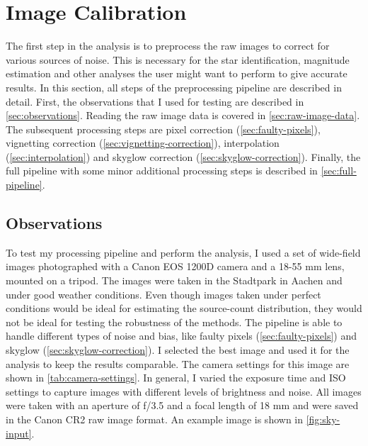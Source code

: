 
\section{Image Calibration}
\label{sec:image-calibration}

The first step in the analysis is to preprocess the raw images to correct for various
sources of noise. This is necessary for the star identification, magnitude estimation and
other analyses the user might want to perform to give accurate results. In this section,
all steps of the preprocessing pipeline are described in detail. First, the observations
that I used for testing are described in \autoref{sec:observations}. Reading the raw image
data is covered in \autoref{sec:raw-image-data}. The subsequent processing steps are pixel
correction (\autoref{sec:faulty-pixels}), vignetting correction
(\autoref{sec:vignetting-correction}), interpolation (\autoref{sec:interpolation}) and
skyglow correction (\autoref{sec:skyglow-correction}). Finally, the full pipeline with
some minor additional processing steps is described in \autoref{sec:full-pipeline}.

\subsection{Observations}
\label{sec:observations}

To test my processing pipeline and perform the analysis, I used a set of wide-field images
photographed with a Canon EOS 1200D camera and a 18-55 mm lens, mounted on a tripod. The
images were taken in the Stadtpark in Aachen and under good weather conditions. Even
though images taken under perfect conditions would be ideal for estimating the
source-count distribution, they would not be ideal for testing the robustness of the
methods. The pipeline is able to handle different types of noise and bias, like faulty
pixels (\autoref{sec:faulty-pixels}) and skyglow (\autoref{sec:skyglow-correction}). I
selected the best image and used it for the analysis to keep the results comparable. The
camera settings for this image are shown in \autoref{tab:camera-settings}. In general, I
varied the exposure time and ISO settings to capture images with different levels of
brightness and noise. All images were taken with an aperture of f/3.5 and a focal length
of 18 mm and were saved in the Canon CR2 raw image format. An example image is shown in
\autoref{fig:sky-input}.

